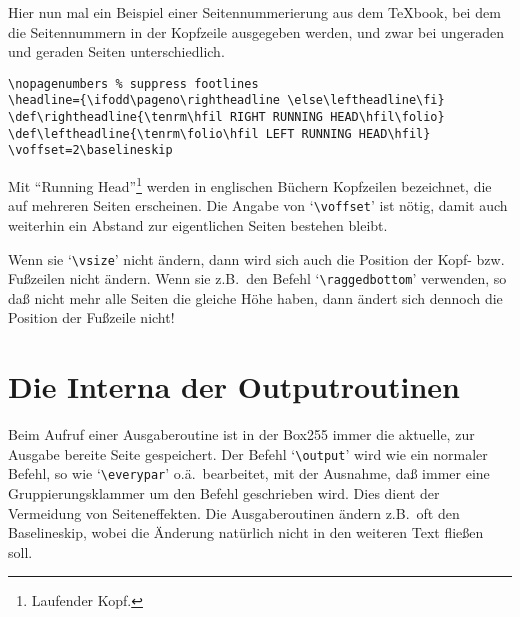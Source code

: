 Hier nun mal ein Beispiel einer 
Seitennummerierung aus dem \TeX book,
bei dem die Seitennummern in der Kopfzeile ausgegeben werden, und zwar
bei ungeraden und geraden 
Seiten unterschiedlich.
\begin{verbatim}
\nopagenumbers % suppress footlines
\headline={\ifodd\pageno\rightheadline \else\leftheadline\fi}
\def\rightheadline{\tenrm\hfil RIGHT RUNNING HEAD\hfil\folio}
\def\leftheadline{\tenrm\folio\hfil LEFT RUNNING HEAD\hfil}
\voffset=2\baselineskip
\end{verbatim}
Mit ``Running Head''\footnote{Laufender 
Kopf.} werden in englischen
B\"uchern Kopfzeilen bezeichnet, die auf mehreren Seiten erscheinen. Die
Angabe von `\verb|\voffset|' ist n\"otig, damit auch weiterhin ein
Abstand zur eigentlichen Seiten bestehen bleibt.

Wenn sie 
`\verb|\vsize|' nicht \"andern, dann wird sich auch die
Position der Kopf- bzw.\ 
Fu\ss{}zeilen nicht \"andern. Wenn sie z.B.\ den
Befehl
`\verb|\raggedbottom|' verwenden, so da\ss{} nicht mehr alle Seiten
die gleiche 
H\"ohe haben, dann \"andert sich dennoch die Position der Fu\ss{}zeile nicht!
\section{Die Interna der Outputroutinen}
Beim Aufruf einer 
Ausgaberoutine ist in der Box255 immer die aktuelle,
zur Ausgabe bereite Seite gespeichert. Der Befehl
`\verb|\output|'
wird wie ein normaler Befehl, so wie
`\verb|\everypar|' o.\"a.\
bearbeitet, mit der Ausnahme, da\ss{} immer eine Gruppierungsklammer um
den Befehl geschrieben wird. Dies dient der Vermeidung von
Seiteneffekten. Die Ausgaberoutinen \"andern z.B.\ oft den Baselineskip,
wobei die \"Anderung nat\"urlich nicht in den weiteren Text flie\ss{}en soll.

